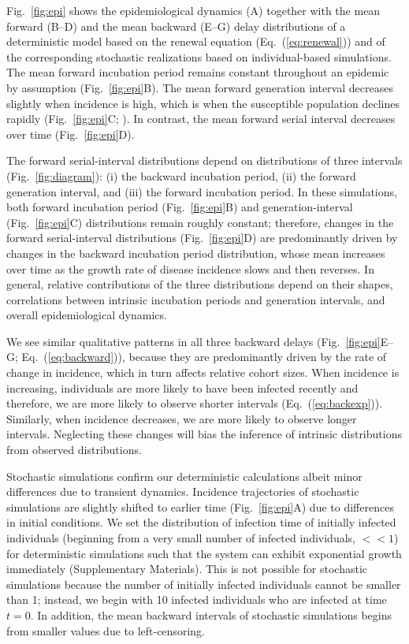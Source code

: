 \documentclass[12pt]{article}
\newcommand{\eref}[1]{Eq.~(\ref{eq:#1})}
\newcommand{\fref}[1]{Fig.~\ref{fig:#1}}
\begin{document}
\fref{epi} shows the epidemiological dynamics (A) together with the mean forward (B--D) and the mean backward (E--G) delay distributions of a deterministic model based on the renewal equation (\eref{renewal}) and of the corresponding stochastic realizations based on individual-based simulations.
The mean forward incubation period remains constant throughout an epidemic by assumption (\fref{epi}B).
The mean forward generation interval decreases slightly when incidence is high, which is when the susceptible population declines rapidly (\fref{epi}C; \cite{kenah2008generation, champredon2015intrinsic}).
In contrast, the mean forward serial interval decreases over time (\fref{epi}D).

The forward serial-interval distributions depend on distributions of three intervals
(\fref{diagram}): (i) the backward incubation period, (ii) the forward generation interval, and (iii) the forward incubation period.
In these simulations, both forward incubation period (\fref{epi}B) and generation-interval (\fref{epi}C) distributions remain roughly constant;
therefore, changes in the forward serial-interval distributions (\fref{epi}D) are predominantly driven by changes in the backward incubation period distribution, whose mean increases over time as the growth rate of disease incidence slows and then reverses.
In general, relative contributions of the three distributions depend on their shapes, correlations between intrinsic incubation periods and generation intervals, and overall epidemiological dynamics.

We see similar qualitative patterns in all three backward delays (\fref{epi}E--G; \eref{backward}), because they are predominantly driven by the rate of change in incidence, which in turn affects relative cohort sizes.
When incidence is increasing, individuals are more likely to have been infected recently and therefore, we are more likely to observe shorter intervals (\eref{backexp}).
Similarly, when incidence decreases, we are more likely to observe longer intervals.
Neglecting these changes will bias the inference of intrinsic distributions from observed distributions.

Stochastic simulations confirm our deterministic calculations albeit minor differences due to transient dynamics.
Incidence trajectories of stochastic simulations are slightly shifted to earlier time (\fref{epi}A) due to differences in initial conditions. 
We set the distribution of infection time of initially infected individuals (beginning from a very small number of infected individuals, $<<1$) for deterministic simulations such that the system can exhibit exponential growth immediately (Supplementary Materials).
This is not possible for stochastic simulations because the number of initially infected individuals cannot be smaller than 1; instead, we begin with 10 infected individuals who are infected at time $t=0$.
In addition, the mean backward intervals of stochastic simulations begins from smaller values due to left-censoring.
\end{document}
